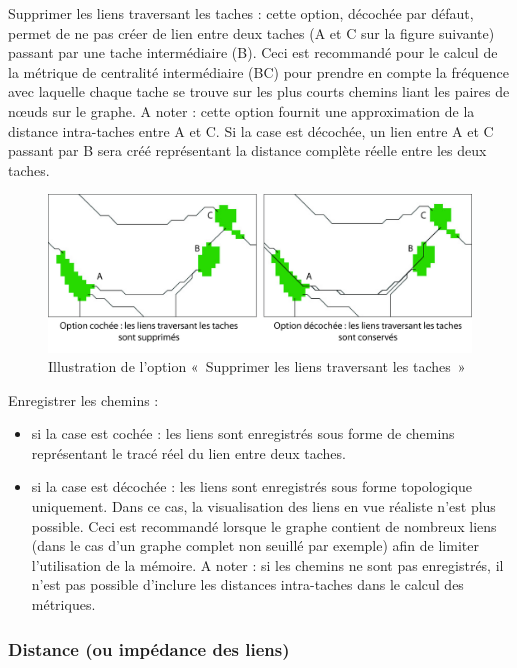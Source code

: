 \documentclass{article}
\begin{document}
Supprimer les liens traversant les taches : cette option, décochée par défaut, permet de ne pas créer de lien entre deux taches (A et C sur la figure suivante) passant par une tache intermédiaire (B). Ceci est recommandé pour le calcul de la métrique de centralité intermédiaire (BC) pour prendre en compte la fréquence avec laquelle chaque tache se trouve sur les plus courts chemins liant les paires de nœuds sur le graphe. A noter : cette option fournit une approximation de la distance intra-taches entre A et C. Si la case est décochée, un lien entre A et C passant par B sera créé représentant la distance complète réelle entre les deux taches. 

\begin{figure}[H]
	\includegraphics[scale=0.5]{img/manual-fr_img5.png} 
	\caption{Illustration de l’option «~Supprimer les liens traversant les taches~»}
\end{figure}
 

Enregistrer les chemins : 
\begin{itemize}
	\item si la case est cochée : les liens sont enregistrés sous forme de chemins représentant le tracé réel du lien entre deux taches. 
	\item si la case est décochée : les liens sont enregistrés sous forme topologique uniquement.  Dans ce cas, la visualisation des liens en vue réaliste n’est plus possible. Ceci est recommandé lorsque le graphe contient de nombreux liens (dans le cas d’un graphe complet non seuillé par exemple) afin de limiter l’utilisation de la mémoire. A noter : si les chemins ne sont pas enregistrés, il n’est pas possible d’inclure les distances intra-taches dans le calcul des métriques.
\end{itemize}


\subsubsection{Distance (ou impédance des liens)}
\end{document}

